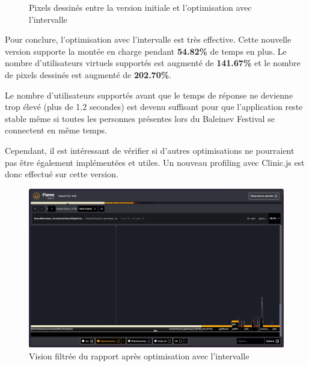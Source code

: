 \begin{figure}[H]
  \centering
  \caption{Pixels dessinés entre la version initiale et l'optimisation avec l'intervalle}
  \label{fig:chart-opti-initial-interval-pixels}
\end{figure}

Pour conclure, l'optimisation avec l'intervalle est très effective. Cette nouvelle version supporte la montée en charge pendant \textbf{54.82\%} de temps en plus. Le nombre d'utilisateurs virtuels supportés est augmenté de \textbf{141.67\%} et le nombre de pixels dessinés est augmenté de \textbf{202.70\%}.

Le nombre d'utilisateurs supportés avant que le temps de réponse ne devienne trop élevé (plus de 1.2 secondes) est devenu suffisant pour que l'application reste stable même si toutes les personnes présentes lors du Baleinev Festival se connectent en même temps.

Cependant, il est intéressant de vérifier si d'autres optimisations ne pourraient pas être également implémentées et utiles. Un nouveau profiling avec Clinic.js est donc effectué sur cette version.


\begin{figure}[H]
  \centering
  \includegraphics[width=1\textwidth]{./assets/figures/flame/flame2-filtered.png}
  \caption{Vision filtrée du rapport après optimisation avec l'intervalle}
  \label{fig:flame2-filtered}
\end{figure}

